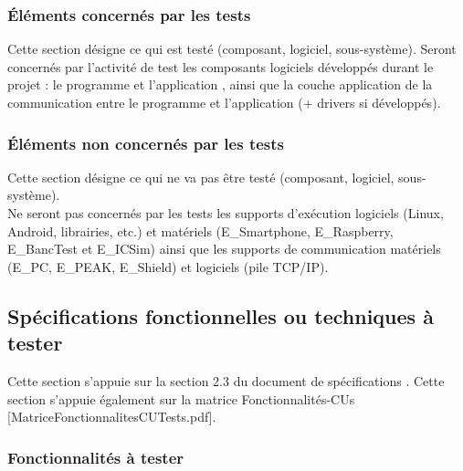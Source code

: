 \subsubsection{Éléments concernés par les tests}
\label{sec:peri:comp:test}
          
Cette section désigne ce qui est testé (composant, logiciel, sous-système).
Seront concernés par l'activité de test les composants logiciels développés durant le projet {\projet}: le programme {\appliC} et l'application {\appliA}, ainsi que la couche application de la communication entre le programme {\appliC} et l'application {\appliA} (+ drivers si développés). 

\subsubsection{Éléments non concernés par les tests}
\label{sec:peri:comp:nontest}

Cette section désigne ce qui ne va pas être testé (composant, logiciel, sous-système).\\
Ne seront pas concernés par les tests les supports d'exécution logiciels (Linux, Android, librairies, etc.) et matériels (E\_Smartphone, E\_Raspberry, E\_BancTest et E\_ICSim) ainsi que les supports de communication matériels (E\_PC, E\_PEAK, E\_Shield) et logiciels (pile TCP/IP). 

\subsection{Spécifications fonctionnelles ou techniques à tester}
\label{sec:peri:spec}

Cette section s'appuie sur la section 2.3 du document de spécifications {}.
Cette section s'appuie également sur la matrice Fonctionnalités-CUs [MatriceFonctionnalitesCUTests.pdf].

\subsubsection{Fonctionnalités à tester}
\label{sec:peri:fct:test}

